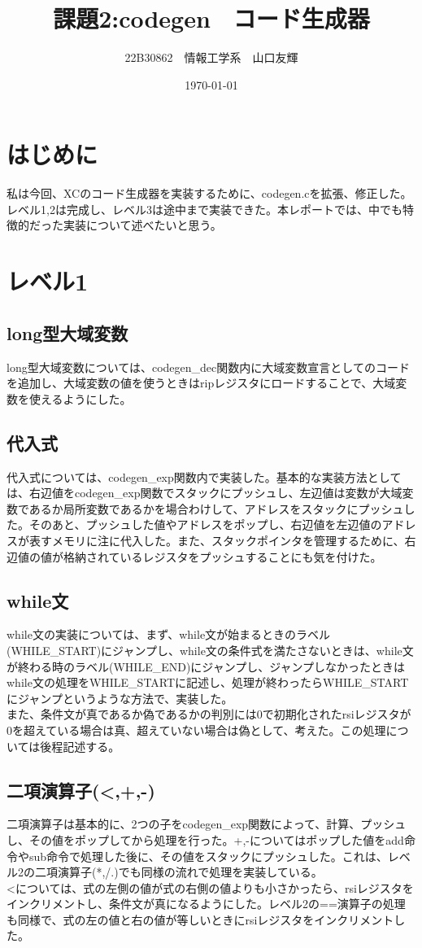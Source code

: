 \documentclass[a4paper,11pt]{jsarticle}
\begin{document}
\title{課題2:codegen　コード生成器}
\author{22B30862　情報工学系　山口友輝}
\date{\today}
\maketitle
\section{はじめに}  
私は今回、XCのコード生成器を実装するために、codegen.cを拡張、修正した。レベル1,2は完成し、レベル3は途中まで実装できた。本レポートでは、中でも特徴的だった実装について述べたいと思う。
\section{レベル1}
\subsection{long型大域変数}  
long型大域変数については、codegen\_dec関数内に大域変数宣言としてのコードを追加し、大域変数の値を使うときはripレジスタにロードすることで、大域変数を使えるようにした。
\subsection{代入式}
代入式については、codegen\_exp関数内で実装した。基本的な実装方法としては、右辺値をcodegen\_exp関数でスタックにプッシュし、左辺値は変数が大域変数であるか局所変数であるかを場合わけして、アドレスをスタックにプッシュした。そのあと、プッシュした値やアドレスをポップし、右辺値を左辺値のアドレスが表すメモリに注に代入した。また、スタックポインタを管理するために、右辺値の値が格納されているレジスタをプッシュすることにも気を付けた。
\subsection{while文}
while文の実装については、まず、while文が始まるときのラベル(WHILE\_START)にジャンプし、while文の条件式を満たさないときは、while文が終わる時のラベル(WHILE\_END)にジャンプし、ジャンプしなかったときはwhile文の処理をWHILE\_STARTに記述し、処理が終わったらWHILE\_STARTにジャンプというような方法で、実装した。\\
\indent
また、条件文が真であるか偽であるかの判別には0で初期化されたrsiレジスタが0を超えている場合は真、超えていない場合は偽として、考えた。この処理については後程記述する。
\subsection{二項演算子(\textless,+,-)}
二項演算子は基本的に、2つの子をcodegen\_exp関数によって、計算、プッシュし、その値をポップしてから処理を行った。+,-についてはポップした値をadd命令やsub命令で処理した後に、その値をスタックにプッシュした。これは、レベル2の二項演算子(*,/.)でも同様の流れで処理を実装している。\\
\indent
\textless については、式の左側の値が式の右側の値よりも小さかったら、rsiレジスタをインクリメントし、条件文が真になるようにした。レベル2の==演算子の処理も同様で、式の左の値と右の値が等しいときにrsiレジスタをインクリメントした。
\end{document}
